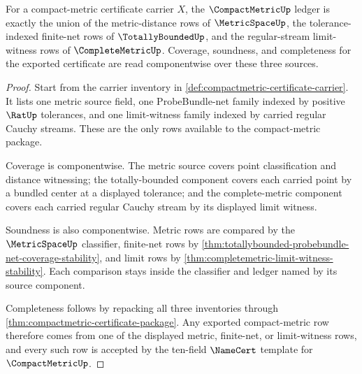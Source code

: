 \begin{theorem}
\label{thm:compactmetric-ledger-exactness-obligation}
For a compact-metric certificate carrier $X$, the $\CompactMetricUp$ ledger is
exactly the union of the metric-distance rows of $\MetricSpaceUp$, the
tolerance-indexed finite-net rows of $\TotallyBoundedUp$, and the regular-stream
limit-witness rows of $\CompleteMetricUp$. Coverage, soundness, and completeness
for the exported certificate are read componentwise over these three sources.
\end{theorem}
\begin{proof}
Start from the carrier inventory in
\autoref{def:compactmetric-certificate-carrier}. It lists one metric source
field, one ProbeBundle-net family indexed by positive $\RatUp$ tolerances, and
one limit-witness family indexed by carried regular Cauchy streams. These are
the only rows available to the compact-metric package.

Coverage is componentwise. The metric source covers point classification and
distance witnessing; the totally-bounded component covers each carried point by
a bundled center at a displayed tolerance; and the complete-metric component
covers each carried regular Cauchy stream by its displayed limit witness.

Soundness is also componentwise. Metric rows are compared by the
$\MetricSpaceUp$ classifier, finite-net rows by
\autoref{thm:totallybounded-probebundle-net-coverage-stability}, and limit rows
by \autoref{thm:completemetric-limit-witness-stability}. Each comparison stays
inside the classifier and ledger named by its source component.

Completeness follows by repacking all three inventories through
\autoref{thm:compactmetric-certificate-package}. Any exported compact-metric row
therefore comes from one of the displayed metric, finite-net, or limit-witness
rows, and every such row is accepted by the ten-field $\NameCert$ template for
$\CompactMetricUp$.
\end{proof}

